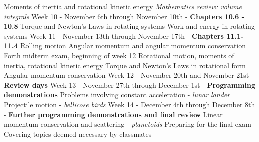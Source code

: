 \documentclass[10pt]{article}
\begin{document}
\begin{outline}[enumerate]
\2 Moments of inertia and rotational kinetic energy
\3 \textit{Mathematics review: volume integrals}
\1 Week 10 - November 6th through November 10th - \textbf{Chapters 10.6 - 10.8}
\2 Torque and Newton's Laws in rotating systems
\2 Work and energy in rotating systems
\1 Week 11 - November 13th through November 17th - \textbf{Chapters 11.1-11.4}
\2 Rolling motion
\2 Angular momentum and angular momentum conservation
\1 Forth midterm exam, beginning of week 12
\2 Rotational motion, moments of inertia, rotational kinetic energy
\2 Torque and Newton's Laws in rotational form
\2 Angular momentum conservation
\1 Week 12 - November 20th and November 21st - \textbf{Review days}
\1 Week 13 - November 27th through December 1st  - \textbf{Programming demonstrations}
\2 Problems involving constant acceleration - \textit{lunar lander}
\2 Projectile motion - \textit{bellicose birds}
\1 Week 14 - December 4th through December 8th - \textbf{Further programming demonstrations and final review}
\2 Linear momentum conservation and scattering - \textit{planetoids}
\2 Preparing for the final exam
\2 Covering topics deemed necessary by classmates
\end{outline}
\end{document}
